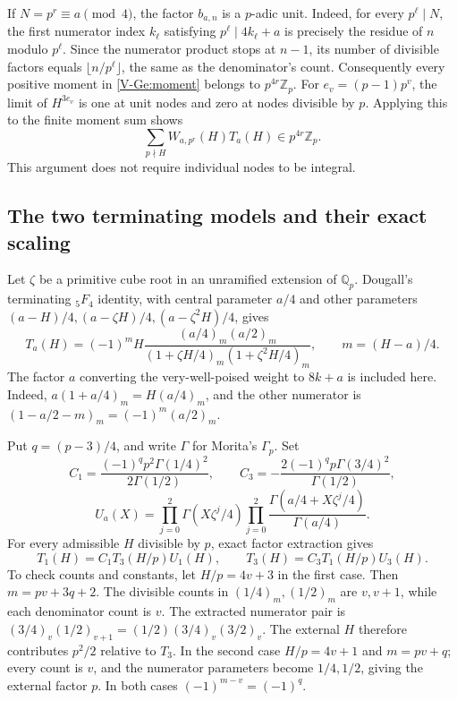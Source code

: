 \documentclass[11pt,letterpaper]{article}
\numberwithin{equation}{section}
\begin{document}
If $N=p^r\equiv a\pmod4$, the factor $b_{a,n}$ is a $p$-adic unit.
Indeed, for every $p^\ell\mid N$, the first numerator index
$k_\ell$ satisfying $p^\ell\mid4k_\ell+a$ is precisely the
residue of $n$ modulo $p^\ell$. Since the numerator product stops
at $n-1$, its number of divisible factors equals
$\lfloor n/p^\ell\rfloor$, the same as the denominator's count.
Consequently every positive moment in \eqref{V-Ge:moment} belongs to
$p^{4r}\mathbb Z_p$.
For $e_v=(p-1)p^v$, the limit of $H^{3e_v}$ is one at unit nodes
and zero at nodes divisible by $p$. Applying this to the finite
moment sum shows
\begin{equation}\label{V-Ge:unitnodes}
\sum_{p\nmid H}W_{a,p^r}(H)T_a(H)\in p^{4r}\mathbb Z_p.
\end{equation}
This argument does not require individual nodes to be integral.

\subsection{The two terminating models and their exact scaling}
Let $\zeta$ be a primitive cube root in an unramified extension of
$\mathbb Q_p$. Dougall's terminating ${}_5F_4$ identity, with central
parameter $a/4$ and other parameters
$(a-H)/4,(a-\zeta H)/4,(a-\zeta^2H)/4$, gives
\begin{equation}\label{V-Ge:models}
 T_a(H)=(-1)^mH\frac{(a/4)_m(a/2)_m}
 {(1+\zeta H/4)_m(1+\zeta^2H/4)_m},\qquad m=(H-a)/4.
\end{equation}
The factor $a$ converting the very-well-poised weight to $8k+a$
is included here. Indeed,
$a(1+a/4)_m=H(a/4)_m$, and the other numerator is
$(1-a/2-m)_m=(-1)^m(a/2)_m$.

Put $q=(p-3)/4$, and write $\Gamma$ for Morita's $\Gamma_p$.
Set
\[
 C_1=\frac{(-1)^q p^2\Gamma(1/4)^2}{2\Gamma(1/2)},\qquad
 C_3=-\frac{2(-1)^q p\Gamma(3/4)^2}{\Gamma(1/2)},
\]
\[
 U_a(X)=\prod_{j=0}^{2}\Gamma(X\zeta^j/4)
 \prod_{j=0}^{2}\frac{\Gamma(a/4+X\zeta^j/4)}{\Gamma(a/4)}.
\]
For every admissible $H$ divisible by $p$, exact factor extraction gives
\begin{equation}\label{V-Ge:modelsteps}
 T_1(H)=C_1T_3(H/p)U_1(H),\qquad
 T_3(H)=C_3T_1(H/p)U_3(H).
\end{equation}
To check counts and constants, let $H/p=4v+3$ in the first case.
Then $m=pv+3q+2$. The divisible counts in
$(1/4)_m,(1/2)_m$ are $v,v+1$, while each denominator count is $v$.
The extracted numerator pair is
$(3/4)_v(1/2)_{v+1}=(1/2)(3/4)_v(3/2)_v$.
The external $H$ therefore contributes $p^2/2$ relative to $T_3$.
In the second case $H/p=4v+1$ and $m=pv+q$; every count is $v$,
and the numerator parameters become $1/4,1/2$, giving the external
factor $p$. In both cases $(-1)^{m-v}=(-1)^q$.
\end{document}
